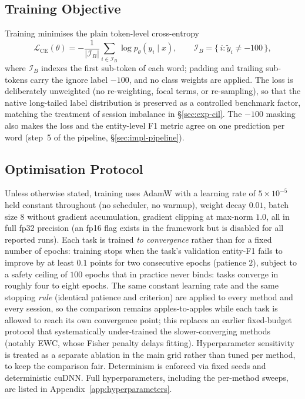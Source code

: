 \subsection{Training Objective}
\label{sec:exp-objective}

Training minimises the plain token-level cross-entropy
\begin{equation}
  \mathcal{L}_{\mathrm{CE}}(\theta)
  = -\frac{1}{|\mathcal{I}_B|} \sum_{i \in \mathcal{I}_B}
    \log p_\theta\!\left(y_i \mid x\right),
  \qquad
  \mathcal{I}_B = \{\, i : \tilde{y}_i \neq -100 \,\},
  \label{eq:token-ce}
\end{equation}
where $\mathcal{I}_B$ indexes the first sub-token of each word; padding and
trailing sub-tokens carry the ignore label $-100$, and no class weights are
applied. The loss is deliberately unweighted (no re-weighting, focal terms, or
re-sampling), so that the native long-tailed label distribution is preserved as
a controlled benchmark factor, matching the treatment of session imbalance in
\S\ref{sec:exp-cil}. The $-100$ masking also makes the loss and the entity-level
F1 metric agree on one prediction per word (step~5 of the pipeline,
\S\ref{sec:impl-pipeline}).

\subsection{Optimisation Protocol}
\label{sec:exp-optim}

Unless otherwise stated, training uses AdamW with a learning rate of
$5\times10^{-5}$ held constant throughout (no scheduler, no warmup), weight
decay $0.01$, batch size 8 without gradient accumulation, gradient clipping at
max-norm $1.0$, all in full fp32 precision (an fp16 flag exists in the framework
but is disabled for all reported runs). Each task is trained \emph{to convergence}
rather than for a fixed number of epochs: training stops when the task's validation
entity-F1 fails to improve by at least $0.1$ points for two consecutive epochs
(patience $2$), subject to a safety ceiling of $100$ epochs that in practice never
binds: tasks converge in roughly four to eight epochs. The same constant learning
rate and the same stopping \emph{rule} (identical patience and criterion) are applied
to every method and every session, so the comparison remains apples-to-apples while
each task is allowed to reach its own convergence point; this replaces an earlier
fixed-budget protocol that systematically under-trained the slower-converging methods
(notably EWC, whose Fisher penalty delays fitting). Hyperparameter sensitivity is
treated as a separate ablation in the main grid rather than tuned per method, to
keep the comparison fair. Determinism is enforced via fixed seeds and
deterministic cuDNN. Full hyperparameters, including the per-method sweeps, are
listed in Appendix~\ref{app:hyperparameters}.

